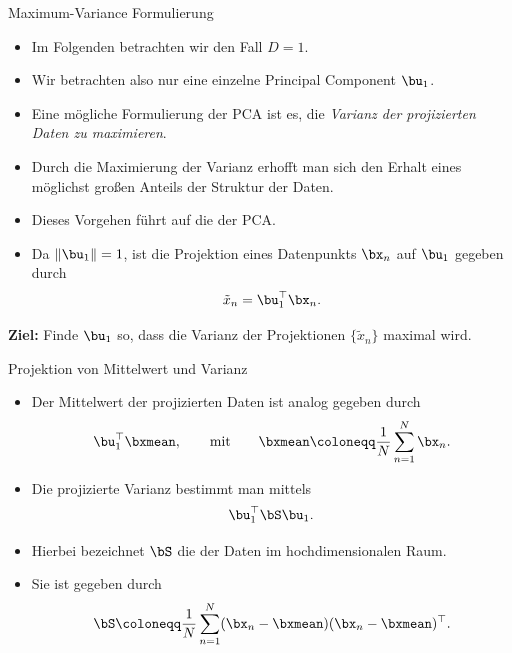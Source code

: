 \begin{frame}{Maximum-Variance Formulierung}{}
	\begin{itemize}
		\item Im Folgenden betrachten wir den Fall $D = 1$.
		\item Wir betrachten also nur eine einzelne Principal Component $\bu_1$.
		\item Eine mögliche Formulierung der PCA ist es, die \textit{Varianz der projizierten Daten zu maximieren}.
		\item Durch die Maximierung der Varianz erhofft man sich den Erhalt eines möglichst großen Anteils
			der Struktur der Daten.
		\item Dieses Vorgehen führt auf die  der PCA.
		\item Da $\Vert \bu_1 \Vert = 1$, ist die Projektion eines Datenpunkts $\bx_n$ auf $\bu_1$ gegeben durch
		\begin{equation} \label{eq:pca-projection-data}
			\tilde{x}_n = \bu_1^\top \bx_n.
		\end{equation}
	\end{itemize}

	\begin{boxGray}
		\begin{center}
			\textbf{Ziel:} Finde $\bu_1$ so, dass die Varianz der Projektionen $\{ \tilde{x}_n \}$ maximal wird.
		\end{center}
	\end{boxGray}
\end{frame}


\begin{frame}{Projektion von Mittelwert und Varianz}{}
	\begin{itemize}
		\item Der Mittelwert der projizierten Daten ist analog gegeben durch
		\begin{equation} \label{eq:pca-projection-mean}
			\bu_1^\top \bxmean,
		\qquad\text{mit}\qquad
			\bxmean \coloneqq \frac{1}{N} \sum_{n=1}^N \bx_n.
		\end{equation}
		\item Die projizierte Varianz bestimmt man mittels
		\begin{equation} \label{eq:pca-projection-variance}
			\bu_1^\top \bS \bu_1.
		\end{equation}
		\item Hierbei bezeichnet $\bS$ die  der Daten im hochdimensionalen Raum.
		\item Sie ist gegeben durch
		\begin{equation} \label{eq:pca-scatter-matrix}
			\bS \coloneqq \frac{1}{N} \sum_{n=1}^N (\bx_n - \bxmean) (\bx_n - \bxmean)^\top.
		\end{equation}
	\end{itemize}
\end{frame}



